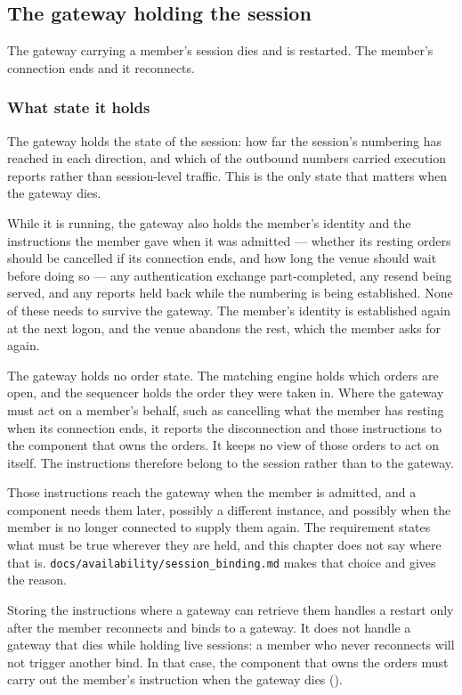 \subsection{The gateway holding the session}
\label{sec:ha:disabled:gateway}

The gateway carrying a member's session dies and is restarted. The member's
connection ends and it reconnects.

\subsubsection{What state it holds}
\label{sec:ha:disabled:gateway:state}

The gateway holds the state of the session: how far the session's numbering has
reached in each direction, and which of the outbound numbers carried execution
reports rather than session-level traffic. This is the only state that matters
when the gateway dies.

While it is running, the gateway also holds the member's identity and the
instructions the member gave when it was admitted --- whether its resting orders
should be cancelled if its connection ends, and how long the venue should wait
before doing so --- any authentication exchange part-completed, any
resend being served, and any reports held back while the numbering is being
established. None of these needs to survive the gateway. The member's identity is
established again at the next logon, and the venue abandons the rest, which the
member asks for again.

The gateway holds no order state. The matching engine holds which orders are
open, and the sequencer holds the order they were taken in. Where the gateway
must act on a member's behalf, such as cancelling what the member has resting
when its connection ends, it reports the disconnection and those instructions to
the component that owns the orders. It keeps no view of those orders to act on
itself. The instructions therefore belong to the session rather than to the
gateway.

Those instructions reach the gateway when the member is admitted, and a component
needs them later, possibly a different instance, and possibly when the member is
no longer connected to supply them again. The requirement  states
what must be true wherever they are held, and this chapter does not say where
that is. \texttt{docs/availability/session\_binding.md} makes that choice and
gives the reason.

Storing the instructions where a gateway can retrieve them handles a restart
only after the member reconnects and binds to a gateway. It does not handle a
gateway that dies while holding live sessions: a member who never reconnects
will not trigger another bind. In that case, the component that owns the orders
must carry out the member's instruction when the gateway dies ().


